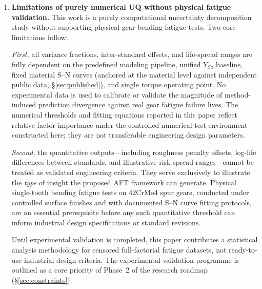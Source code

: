 \documentclass[twocolumn,12pt,a4paper]{article}
\begin{document}
\begin{enumerate}
        I nonetheless acknowledge that the non-informative censoring
        assumption cannot be formally tested with the available data. A
        rigorous assessment would require physical test data at multiple
        stress levels straddling the fatigue limit, or a sensitivity
        analysis under a pattern-mixture model that allows the censoring
        probability to depend on unobserved failure time. Both are
        deferred to the experimental validation programme outlined in
        Phase~2 (\S\ref{sec:constraints}).

  \item \textbf{Limitations of purely numerical UQ without physical
        fatigue validation.} This work is a purely computational
        uncertainty decomposition study without supporting physical gear
        bending fatigue tests. Two core limitations follow:

        \textit{First,} all variance fractions, inter-standard offsets,
        and life-spread ranges are fully dependent on the predefined
        modeling pipeline, unified $Y_{Sa}$ baseline, fixed material
        S--N curves (anchored at the material level against independent
        public data, \S\ref{sec:published}), and single torque operating
        point. No experimental
        data is used to calibrate or validate the magnitude of
        method-induced prediction divergence against real gear fatigue
        failure lives. The numerical thresholds and fitting equations
        reported in this paper reflect relative factor importance under
        the controlled numerical test environment constructed here; they
        are not transferable engineering design parameters.

        \textit{Second,} the quantitative outputs---including roughness
        penalty offsets, log-life differences between standards, and
        illustrative risk-spread ranges---cannot be treated as validated
        engineering criteria. They serve exclusively to illustrate the
        \emph{type} of insight the proposed AFT framework can generate.
        Physical single-tooth bending fatigue tests on 42CrMo4 spur
        gears, conducted under controlled surface finishes and with
        documented S--N curve fitting protocols, are an essential
        prerequisite before any such quantitative threshold can inform
        industrial design specifications or standard revisions.

        Until experimental validation is completed, this paper
        contributes a statistical analysis methodology for censored
        full-factorial fatigue datasets, not ready-to-use industrial
        design criteria. The experimental validation programme is
        outlined as a core priority of Phase~2 of the research roadmap
        (\S\ref{sec:constraints}).


\end{enumerate}
\end{document}
